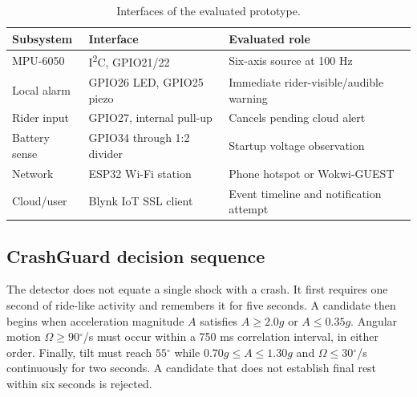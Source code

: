 \documentclass[12pt,a4paper]{article}
\newcommand{\degree}{\ensuremath{^{\circ}}}
\begin{document}
\begin{table}[H]
\centering
\small
\caption{Interfaces of the evaluated prototype.}
\begin{tabularx}{\textwidth}{@{}p{}p{}X@{}}
\toprule
Subsystem & Interface & Evaluated role \\
\midrule
MPU-6050 & I\textsuperscript{2}C, GPIO21/22 & Six-axis source at 100 Hz \\
Local alarm & GPIO26 LED, GPIO25 piezo & Immediate rider-visible/audible warning \\
Rider input & GPIO27, internal pull-up & Cancels pending cloud alert \\
Battery sense & GPIO34 through 1:2 divider & Startup voltage observation \\
Network & ESP32 Wi-Fi station & Phone hotspot or Wokwi-GUEST \\
Cloud/user & Blynk IoT SSL client & Event timeline and notification attempt \\
\bottomrule
\end{tabularx}
\end{table}

\subsection{CrashGuard decision sequence}

The detector does not equate a single shock with a crash. It first requires
one second of ride-like activity and remembers it for five seconds. A candidate
then begins when acceleration magnitude $A$ satisfies $A\geq2.0g$ or
$A\leq0.35g$. Angular motion $\Omega\geq90\degree$/s must occur within a
750 ms correlation interval, in either order. Finally, tilt must reach
$55\degree$ while $0.70g\leq A\leq1.30g$ and
$\Omega\leq30\degree$/s continuously for two seconds. A candidate that does
not establish final rest within six seconds is rejected.
\end{document}
